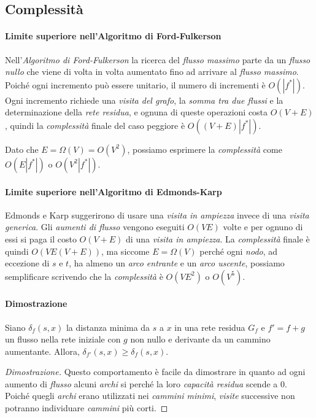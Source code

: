 \subsection{Complessità}
\paragraph{Limite superiore nell'Algoritmo di Ford-Fulkerson}
Nell'\emph{Algoritmo di Ford-Fulkerson} la ricerca del \emph{flusso massimo}
parte da un \emph{flusso nullo} che viene di volta in volta aumentato fino ad
arrivare al \emph{flusso massimo}. Poiché ogni incremento può essere unitario,
il numero di incrementi è $O(|f^*|)$. Ogni incremento richiede una \emph{visita
del grafo}, la \emph{somma tra due flussi} e la determinazione della \emph{rete
residua}, e ognuna di queste operazioni costa $O(V+E)$, quindi la
\emph{complessità} finale del caso peggiore è $O((V+E)|f^*|)$.

\begin{note}
    Dato che $E=\Omega(V)=O(V^2)$, possiamo esprimere la \emph{complessità} come
    $O(E|f^*|)$ o $O(V^2|f^*|)$.
\end{note}

\paragraph{Limite superiore nell'Algoritmo di Edmonds-Karp}
Edmonds e Karp suggerirono di usare una \emph{visita in ampiezza} invece di una
\emph{visita generica}. Gli \emph{aumenti di flusso} vengono eseguiti $O(VE)$
volte e per ognuno di essi si paga il costo $O(V+E)$ di una \emph{visita in
ampiezza}. La \emph{complessità} finale è quindi $O(VE(V+E))$, ma siccome
$E=\Omega(V)$ perché ogni \emph{nodo}, ad eccezione di $s$ e $t$, ha almeno
un \emph{arco entrante} e un \emph{arco uscente}, possiamo semplificare
scrivendo che la \emph{complessità} è $O(VE^2)$ o $O(V^5)$.

\paragraph{Dimostrazione}
\begin{definition}[Monotonia]
    Siano $\delta_f(s,x)$ la distanza minima da $s$ a $x$ in una rete residua
    $G_f$ e $f'=f+g$ un flusso nella rete iniziale con $g$ non nullo e
    derivante da un cammino aumentante. Allora, $\delta_{f'}(s,x)\geq\delta_f(s,x)$.
\end{definition}
\begin{proof}[Dimostrazione]
    Questo comportamento è facile da dimostrare in quanto ad ogni aumento di
    \emph{flusso} alcuni \emph{archi} si  perché la loro
    \emph{capacità residua} scende a $0$. Poiché quegli \emph{archi} erano
    utilizzati nei \emph{cammini minimi}, \emph{visite} successive non potranno
    individuare \emph{cammini} più corti.
\end{proof}

